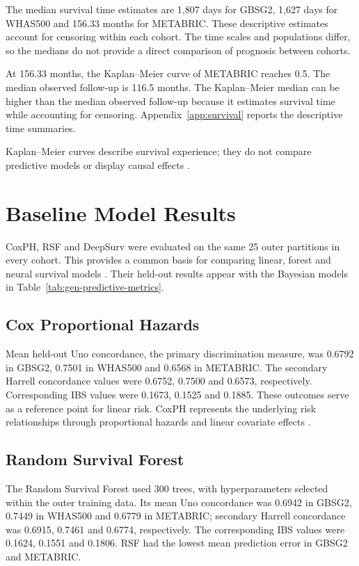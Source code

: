 The median survival time estimates are 1,807 days for GBSG2, 1,627 days for WHAS500 and 156.33 months for METABRIC. These descriptive estimates account for censoring within each cohort. The time scales and populations differ, so the medians do not provide a direct comparison of prognosis between cohorts.

At 156.33 months, the Kaplan--Meier curve of METABRIC reaches 0.5. The median observed follow-up is 116.5 months. The Kaplan--Meier median can be higher than the median observed follow-up because it estimates survival time while accounting for censoring. Appendix~\ref{app:survival} reports the descriptive time summaries.

Kaplan--Meier curves describe survival experience; they do not compare predictive models or display causal effects \cite{ref14}.

\section{Baseline Model Results}\label{baseline-model-results}

CoxPH, RSF and DeepSurv were evaluated on the same 25 outer partitions in every cohort. This provides a common basis for comparing linear, forest and neural survival models \cite{ref33,ref37}. Their held-out results appear with the Bayesian models in Table~\ref{tab:gen-predictive-metrics}.

\subsection{Cox Proportional Hazards}\label{cox-proportional-hazards-1}

Mean held-out Uno concordance, the primary discrimination measure, was 0.6792 in GBSG2, 0.7501 in WHAS500 and 0.6568 in METABRIC. The secondary Harrell concordance values were 0.6752, 0.7500 and 0.6573, respectively. Corresponding IBS values were 0.1673, 0.1525 and 0.1885. These outcomes serve as a reference point for linear risk. CoxPH represents the underlying risk relationships through proportional hazards and linear covariate effects \cite{cox1972}.

\subsection{Random Survival Forest}\label{random-survival-forest-1}

The Random Survival Forest used 300 trees, with hyperparameters selected within the outer training data. Its mean Uno concordance was 0.6942 in GBSG2, 0.7449 in WHAS500 and 0.6779 in METABRIC; secondary Harrell concordance was 0.6915, 0.7461 and 0.6774, respectively. The corresponding IBS values were 0.1624, 0.1551 and 0.1806. RSF had the lowest mean prediction error in GBSG2 and METABRIC.

